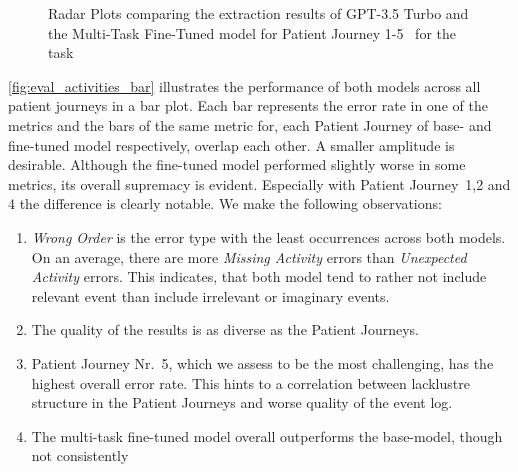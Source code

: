 \begin{figure}
  \caption{Radar Plots comparing the extraction results of GPT-3.5 Turbo and the Multi-Task Fine-Tuned model for Patient Journey 1-5~ for the task }
  \label{fig:eval_activities_rad}
\end{figure}
\autoref{fig:eval_activities_bar} illustrates the performance of both models across all patient journeys in a bar plot. Each bar represents the error rate in one of the metrics and the bars of the same metric for, each Patient Journey of base- and fine-tuned model respectively, overlap each other. A smaller amplitude is desirable. Although the fine-tuned model performed slightly worse in some metrics, its overall supremacy is evident. Especially with Patient Journey~1,2 and 4 the difference is clearly notable.  We make the following observations:
\begin{enumerate}
    \item \emph{Wrong Order} is the error type with the least occurrences across both models. On an average, there are more \emph{Missing Activity} errors than \emph{Unexpected Activity} errors. This indicates, that both model tend to rather not include relevant event than include irrelevant or imaginary events.
    \item The quality of the results is as diverse as the Patient Journeys.
    \item Patient Journey Nr.~5, which we assess to be the most challenging, has the highest overall error rate. This hints to a correlation between lacklustre structure in the Patient Journeys and worse quality of the event log.
    \item The multi-task fine-tuned model overall outperforms the base-model, though not consistently
\end{enumerate}

